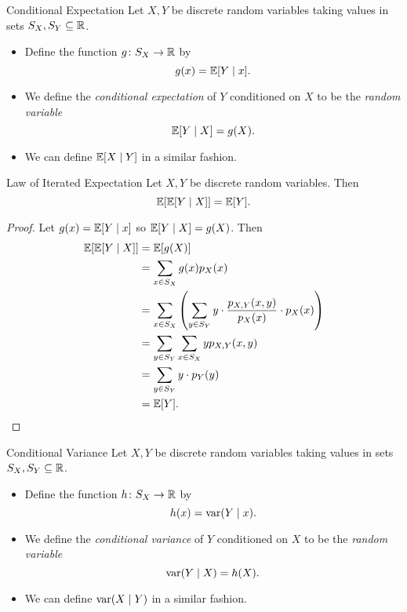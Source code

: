 \documentclass[class=article, crop=false]{standalone}
\begin{document}
  \begin{definition}{Conditional Expectation}
    Let $X, Y$ be discrete random variables taking values in sets $S_X, S_Y\subseteq\mathbb{R}$.
    \begin{itemize}
      \item Define the function $g\colon S_X\to \mathbb{R}$ by 
      \[
        g(x) = \mathbb{E}[Y\mid x].
      \]
      \item We define the \emph{conditional expectation} of $Y$ conditioned on $X$ to be the \emph{random variable}
      \[
        \mathbb{E}[Y\mid X] = g(X).
      \]
      \item We can define $\mathbb{E}[X\mid Y]$ in a similar fashion.
    \end{itemize}
  \end{definition}
  \begin{theorem}{Law of Iterated Expectation}
    Let $X, Y$ be discrete random variables. Then
    \[
      \mathbb{E}[\mathbb{E}[Y\mid X]] = \mathbb{E}[Y].
    \]
    \begin{proof}
      Let $g(x) = \mathbb{E}[Y\mid x]$ so $\mathbb{E}[Y\mid X] = g(X)$. Then
      \begin{align*}
        \mathbb{E}[\mathbb{E}[Y\mid X]] &= \mathbb{E}[g(X)] \\
                        &= \sum_{x\in S_X}g(x)p_X(x) \\
                        &= \sum_{x\in S_X} \left( \sum_{y\in S_Y}y\cdot \frac{p_{X, Y}(x, y)}{p_X(x)}\cdot p_X(x) \right) \\
                        &= \sum_{y\in S_Y}\sum_{x\in S_X}y p_{X, Y}(x, y) \\
                        &= \sum_{y\in S_Y}y\cdot p_Y(y) \\
                        &= \mathbb{E}[Y].
      \end{align*}
    \end{proof}
  \end{theorem}
  \begin{definition}{Conditional Variance}
    Let $X, Y$ be discrete random variables taking values in sets $S_X, S_Y\subseteq\mathbb{R}$.
    \begin{itemize}
      \item Define the function $h\colon S_X\to \mathbb{R}$ by
      \[
        h(x) = \operatorname{var}(Y\mid x).
      \]
      \item We define the \emph{conditional variance} of $Y$ conditioned on $X$ to be the \emph{random variable}
      \[
        \operatorname{var}(Y\mid X) = h(X).
      \]
      \item We can define $\operatorname{var}(X\mid Y)$ in a similar fashion.
    \end{itemize}
  \end{definition}
\end{document}
